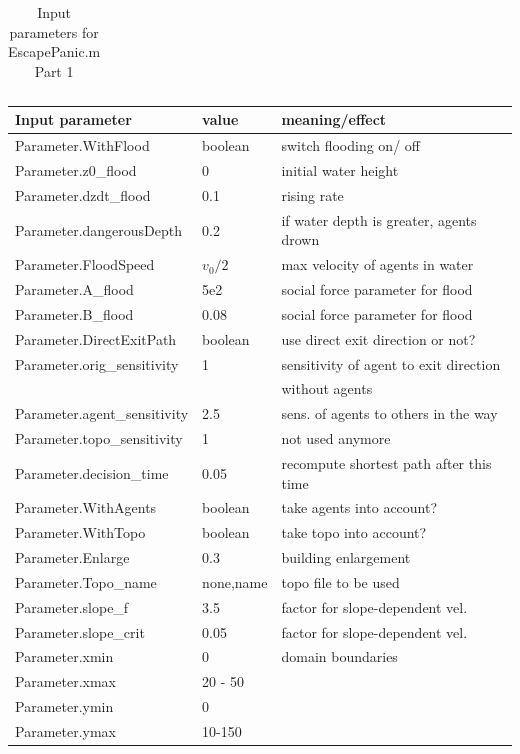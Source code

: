 \documentclass[11pt]{article}
\begin{document}
\begin{appendix}
\begin{table}
\begin{tabular}{l l l}
\hline

\hline
\end{tabular}
\label{tab:input}
\caption{Input parameters for EscapePanic.m Part 1}
\end{table}


\begin{table}
\begin{tabular}{l l l}
\hline
\textbf{Input parameter} & \textbf{value} & \textbf{meaning/effect}\\  
\hline
Parameter.WithFlood & boolean & switch flooding on/ off\\
Parameter.z0\_flood & 0 & initial water height\\
Parameter.dzdt\_flood & 0.1 & rising rate\\
Parameter.dangerousDepth & 0.2 & if water depth is greater, agents drown\\
Parameter.FloodSpeed & $v_0/2$ & max velocity of agents in water\\
Parameter.A\_flood & 5e2 & social force parameter for flood\\
Parameter.B\_flood & 0.08 & social force parameter for flood\\ 
Parameter.DirectExitPath & boolean & use direct exit direction or not?\\
Parameter.orig\_sensitivity & 1 & sensitivity of agent to exit direction\\
& & without agents\\
Parameter.agent\_sensitivity & 2.5 & sens. of agents to others in the way\\
Parameter.topo\_sensitivity & 1 & not used anymore\\
Parameter.decision\_time & 0.05 & recompute shortest path after this time\\
Parameter.WithAgents & boolean & take agents into account?\\
Parameter.WithTopo & boolean & take topo into account?\\
Parameter.Enlarge & 0.3 & building enlargement \\
Parameter.Topo\_name & none,name & topo file to be used\\
Parameter.slope\_f & 3.5&factor for slope-dependent vel.\\
Parameter.slope\_crit & 0.05 & factor for slope-dependent vel.\\
Parameter.xmin & 0 & domain boundaries\\
Parameter.xmax & 20 - 50\\
Parameter.ymin & 0 \\
Parameter.ymax & 10-150\\


\end{tabular}
\end{table}
\end{appendix}
\end{document}
